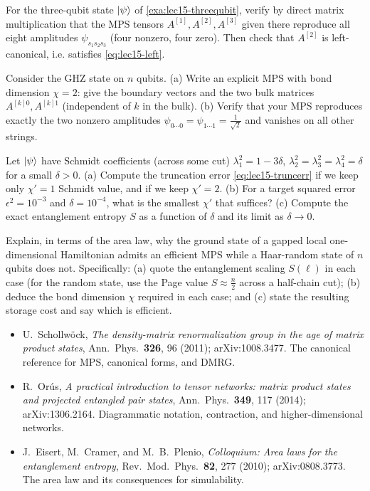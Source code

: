 \begin{exercise}\label{ex:lec15-4}
For the three-qubit state $\ket{\psi}$ of \cref{exa:lec15-threequbit}, verify by
direct matrix multiplication that the MPS tensors $A^{[1]},A^{[2]},A^{[3]}$ given
there reproduce all eight amplitudes $\psi_{s_1 s_2 s_3}$ (four nonzero, four
zero). Then check that $A^{[2]}$ is left-canonical, i.e. satisfies
\eqref{eq:lec15-left}.
\end{exercise}

\begin{exercise}\label{ex:lec15-5}
Consider the GHZ state on $n$ qubits. (a) Write an explicit MPS with bond
dimension $\chi=2$: give the boundary vectors and the two bulk matrices
$A^{[k]0},A^{[k]1}$ (independent of $k$ in the bulk). (b) Verify that your MPS
reproduces exactly the two nonzero amplitudes $\psi_{0\cdots0}=\psi_{1\cdots1}=\tfrac1{\sqrt2}$
and vanishes on all other strings.
\end{exercise}

\begin{exercise}\label{ex:lec15-6}
Let $\ket{\psi}$ have Schmidt coefficients (across some cut)
$\lambda_1^{2}=1-3\delta$, $\lambda_2^{2}=\lambda_3^{2}=\lambda_4^{2}=\delta$ for a
small $\delta>0$. (a) Compute the truncation error \eqref{eq:lec15-truncerr} if we
keep only $\chi'=1$ Schmidt value, and if we keep $\chi'=2$. (b) For a target
squared error $\epsilon^{2}=10^{-3}$ and $\delta=10^{-4}$, what is the smallest
$\chi'$ that suffices? (c) Compute the exact entanglement entropy $S$ as a function
of $\delta$ and its limit as $\delta\to0$.
\end{exercise}

\begin{exercise}\label{ex:lec15-7}
Explain, in terms of the area law, why the ground state of a gapped local
one-dimensional Hamiltonian admits an efficient MPS while a Haar-random state of
$n$ qubits does not. Specifically: (a) quote the entanglement scaling $S(\ell)$ in
each case (for the random state, use the Page value $S\approx \tfrac{n}{2}$ across
a half-chain cut); (b) deduce the bond dimension $\chi$ required in each case; and
(c) state the resulting storage cost and say which is efficient.
\end{exercise}

\readingsection
\begin{itemize}[leftmargin=1.4em]
  \item U.~Schollw\"ock, \emph{The density-matrix renormalization group in the age
        of matrix product states}, Ann.~Phys.\ \textbf{326}, 96 (2011);
        arXiv:1008.3477. The canonical reference for MPS, canonical forms, and
        DMRG.
  \item R.~Or\'us, \emph{A practical introduction to tensor networks: matrix
        product states and projected entangled pair states}, Ann.~Phys.\
        \textbf{349}, 117 (2014); arXiv:1306.2164. Diagrammatic notation,
        contraction, and higher-dimensional networks.
  \item J.~Eisert, M.~Cramer, and M.~B.~Plenio, \emph{Colloquium: Area laws for
        the entanglement entropy}, Rev.~Mod.~Phys.\ \textbf{82}, 277 (2010);
        arXiv:0808.3773. The area law and its consequences for simulability.
\end{itemize}
